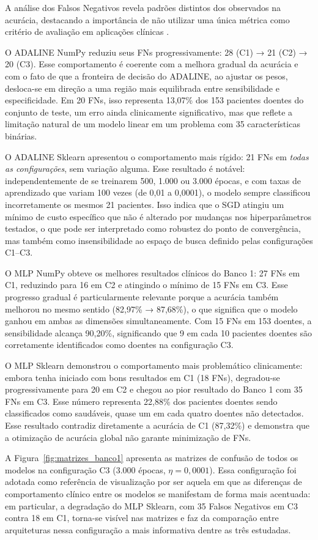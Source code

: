 A análise dos Falsos Negativos revela padrões distintos dos observados na acurácia, destacando a importância de não utilizar uma única métrica como critério de avaliação em aplicações clínicas \cite{braga2007}.

O ADALINE NumPy reduziu seus FNs progressivamente: 28 (C1) → 21 (C2) → 20 (C3). Esse comportamento é coerente com a melhora gradual da acurácia e com o fato de que a fronteira de decisão do ADALINE, ao ajustar os pesos, desloca-se em direção a uma região mais equilibrada entre sensibilidade e especificidade. Em 20 FNs, isso representa 13,07\% dos 153 pacientes doentes do conjunto de teste, um erro ainda clinicamente significativo, mas que reflete a limitação natural de um modelo linear em um problema com 35 características binárias.

O ADALINE Sklearn apresentou o comportamento mais rígido: 21 FNs em \textit{todas as configurações}, sem variação alguma. Esse resultado é notável: independentemente de se treinarem 500, 1.000 ou 3.000 épocas, e com taxas de aprendizado que variam 100 vezes (de 0,01 a 0,0001), o modelo sempre classificou incorretamente os mesmos 21 pacientes. Isso indica que o SGD atingiu um mínimo de custo específico que não é alterado por mudanças nos hiperparâmetros testados, o que pode ser interpretado como robustez do ponto de convergência, mas também como insensibilidade ao espaço de busca definido pelas configurações C1--C3.

O MLP NumPy obteve os melhores resultados clínicos do Banco 1: 27 FNs em C1, reduzindo para 16 em C2 e atingindo o mínimo de 15 FNs em C3. Esse progresso gradual é particularmente relevante porque a acurácia também melhorou no mesmo sentido (82,97\% → 87,68\%), o que significa que o modelo ganhou em ambas as dimensões simultaneamente. Com 15 FNs em 153 doentes, a sensibilidade alcança 90,20\%, significando que 9 em cada 10 pacientes doentes são corretamente identificados como doentes na configuração C3.

O MLP Sklearn demonstrou o comportamento mais problemático clinicamente: embora tenha iniciado com bons resultados em C1 (18 FNs), degradou-se progressivamente para 20 em C2 e chegou ao pior resultado do Banco 1 com 35 FNs em C3. Esse número representa 22,88\% dos pacientes doentes sendo classificados como saudáveis, quase um em cada quatro doentes não detectados. Esse resultado contradiz diretamente a acurácia de C1 (87,32\%) e demonstra que a otimização de acurácia global não garante minimização de FNs.

A Figura~\ref{fig:matrizes_banco1} apresenta as matrizes de confusão de todos os modelos na configuração C3 (3.000 épocas, $\eta = 0{,}0001$). Essa configuração foi adotada como referência de visualização por ser aquela em que as diferenças de comportamento clínico entre os modelos se manifestam de forma mais acentuada: em particular, a degradação do MLP Sklearn, com 35 Falsos Negativos em C3 contra 18 em C1, torna-se visível nas matrizes e faz da comparação entre arquiteturas nessa configuração a mais informativa dentre as três estudadas.

